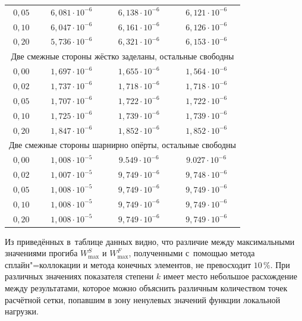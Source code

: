 \begin{table}[h!]
\begin{tabular}{c|c|c|c}
		$0,05$	& $ 6,081 \cdot 10^{-6} $ & $ 6,138 \cdot 10^{-6} $ & $ 6,121 \cdot 10^{-6} $ \\
		$0,10$	& $ 6,047 \cdot 10^{-6} $ & $ 6,161 \cdot 10^{-6} $ & $ 6,126 \cdot 10^{-6} $ \\
		$0,20$	& $ 5,736 \cdot 10^{-6} $ & $ 6,321 \cdot 10^{-6} $ & $ 6,153 \cdot 10^{-6} $ \\ \hline
		\multicolumn{4}{c}{\rule{0mm}{12pt}Две смежные стороны жёстко заделаны, остальные свободны} \\ \hline
\rule{0mm}{12pt}%
		$0,00$	& $ 1,697 \cdot 10^{-6} $ & $ 1,655 \cdot 10^{-6} $ & $ 1,564 \cdot 10^{-6} $ \\
		$0,02$	& $ 1,737 \cdot 10^{-6} $ & $ 1,718 \cdot 10^{-6} $ & $ 1,718 \cdot 10^{-6} $ \\
		$0,05$	& $ 1,707 \cdot 10^{-6} $ & $ 1,722 \cdot 10^{-6} $ & $ 1,722 \cdot 10^{-6} $ \\
		$0,10$	& $ 1,725 \cdot 10^{-6} $ & $ 1,739 \cdot 10^{-6} $ & $ 1,739 \cdot 10^{-6} $ \\
		$0,20$	& $ 1,847 \cdot 10^{-6} $ & $ 1,852 \cdot 10^{-6} $ & $ 1,852 \cdot 10^{-6} $ \\ \hline
		\multicolumn{4}{c}{\rule{0mm}{12pt}Две смежные стороны шарнирно опёрты, остальные свободны} \\ \hline
\rule{0mm}{12pt}%
		$0,00$	& $ 1,008 \cdot 10^{-5} $ & $ 9.549 \cdot 10^{-6} $ & $ 9.027 \cdot 10^{-6} $ \\
		$0,02$	& $ 1,007 \cdot 10^{-5} $ & $ 9,749 \cdot 10^{-6} $ & $ 9,748 \cdot 10^{-6} $ \\
		$0,05$	& $ 1,008 \cdot 10^{-5} $ & $ 9,749 \cdot 10^{-6} $ & $ 9,749 \cdot 10^{-6} $ \\
		$0,10$	& $ 1,008 \cdot 10^{-5} $ & $ 9,749 \cdot 10^{-6} $ & $ 9,749 \cdot 10^{-6} $ \\
		$0,20$	& $ 1,008 \cdot 10^{-5} $ & $ 9,749 \cdot 10^{-6} $ & $ 9,749 \cdot 10^{-6} $ \\ \hline
	\end{tabular}
\end{table}

Из приведённых в~таблице данных видно, что различие между максимальными значениями прогиба $W_{\max}^S$ и $W_{\max}^F$, полученными с~помощью метода сплайн"=коллокации и метода конечных элементов, не превосходит $10\,\%$. 
При различных значениях показателя степени $k$ имеет место небольшое расхождение между результатами, которое можно объяснить различным количеством точек расчётной сетки, попавшим в зону ненулевых значений функции локальной нагрузки.

